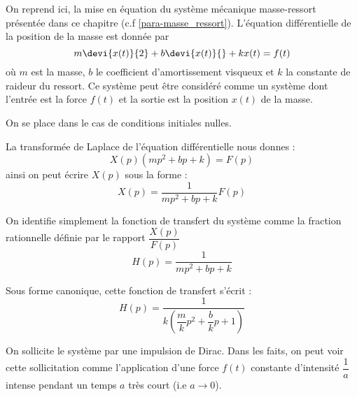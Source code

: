 On reprend ici, la mise en équation du système mécanique masse-ressort 
présentée dans ce chapitre (c.f \cref{para-masse_ressort}). L'équation 
différentielle de la position de la masse est donnée par 
\[
m\devi{x(t)}{2}+b\devi{x(t)}{}+kx(t)=f(t)
\]
où $m$ est la masse, $b$ le coefficient d'amortissement visqueux et $k$ la
constante de raideur du ressort. Ce système peut être considéré comme
un système dont l'entrée est la force $f(t)$ et la sortie est la position
$x(t)$ de la masse.
\begin{marginfigure}
    \centering
    
\end{marginfigure}
On se place dans le cas de conditions initiales nulles. 

La transformée de Laplace de l'équation différentielle nous donnes : 
\[
    X(p)\left(mp^2+bp+k\right)=F(p)
\]
ainsi on peut écrire $X(p)$ sous la forme :
\[
    X(p)=\dfrac{1}{mp^2+bp+k}F(p)
\]

On identifie simplement la fonction de transfert du système comme la fraction 
rationnelle définie par le rapport $\dfrac{X(p)}{F(p)}$
\[
    H(p)=\dfrac{1}{mp^2+bp+k}
\]

Sous forme canonique, cette fonction de transfert s'écrit :
\[
    H(p)=\dfrac{1}{k\left(\dfrac{m}{k}p^2+\dfrac{b}{k}p+1\right)}
\]


On sollicite le système par une impulsion de Dirac. Dans les faits, on peut 
voir cette sollicitation comme l'application d'une force $f(t)$ constante 
d'intensité $\dfrac{1}{a}$ intense pendant un temps $a$ très court 
(i.e $a\to0$).    

